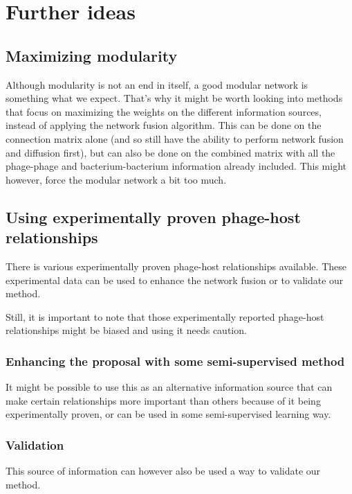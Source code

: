 \documentclass{article}
\begin{document}
\section{Further ideas}

\subsection{Maximizing modularity}

Although modularity is not an end in itself, a good modular network is
something what we expect. That's why it might be worth looking into methods 
that focus on maximizing
the weights on the different information sources, 
instead of applying the network fusion algorithm.
This can be done on the connection matrix alone 
(and so still have the ability to perform network fusion and diffusion first),
but can also be done on the combined matrix with 
all the phage-phage and bacterium-bacterium information already included.  
This might however, force the modular network a bit too much.

\subsection{Using experimentally proven phage-host relationships}

There is various experimentally proven phage-host relationships available. 
These experimental data can be used to enhance the network fusion or 
to validate our method. 

Still, it is important to note that those experimentally reported phage-host
relationships might be biased and using it needs caution.

\subsubsection{Enhancing the proposal with some semi-supervised method}
It might be possible to use this as an alternative information source that
can make certain relationships more important than others because
of it being experimentally proven, or can be used in some semi-supervised
learning way.

\subsubsection{Validation}

This source of information can however also be used a way to validate
our method. 
\end{document}
